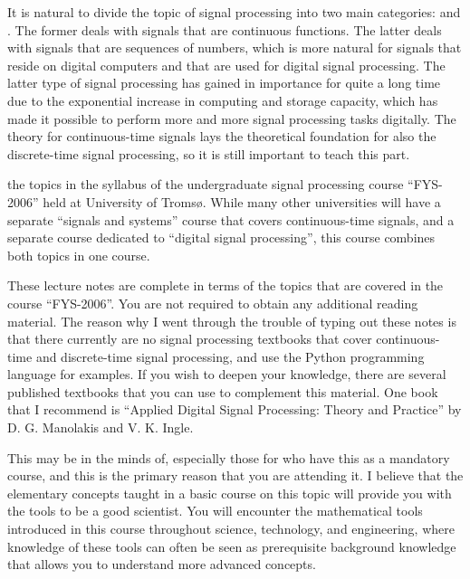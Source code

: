 It is natural to divide the topic of signal processing into two main
categories: \emph{}
and \emph{}. The former deals with
signals that are continuous functions. The latter deals with signals
that are sequences of numbers, which is more natural for signals that
reside on digital computers and that are used for digital signal
processing. The latter type of signal processing has gained in
importance for quite a long time due to the exponential increase in
computing and storage capacity, which has made it possible to perform
more and more signal processing tasks digitally. The theory for
continuous-time signals lays the theoretical foundation for also the
discrete-time signal processing, so it is still important to teach
this part.

 the topics in the syllabus of the
undergraduate signal processing course ``FYS-2006'' held at University
of Troms\o{}. While many other universities will have a separate
``signals and systems'' course that covers continuous-time signals,
and a separate course dedicated to ``digital signal processing'', this
course combines both topics in one course.

These lecture notes are complete in terms of the topics that are
covered in the course ``FYS-2006''. You are not required to obtain any
additional reading material. The reason why I went through the trouble
of typing out these notes is that there currently are no signal
processing textbooks that cover continuous-time and discrete-time
signal processing, and use the Python programming language for
examples. If you wish to deepen your knowledge, there are several
published textbooks that you can use to complement this material. One
book that I recommend is ``Applied Digital Signal Processing: Theory
and Practice'' by D. G. Manolakis and V. K. Ingle.




This may be in the minds of, especially those for who have this as a mandatory course,
and this is the primary reason that you are attending it.
I believe that the elementary concepts taught in a basic course on this topic will provide
you with the tools to be a good scientist. You will encounter the mathematical tools
introduced in this course throughout science, technology, and engineering, where knowledge
of these tools can often be seen as prerequisite background knowledge
that allows you to understand more advanced concepts.

